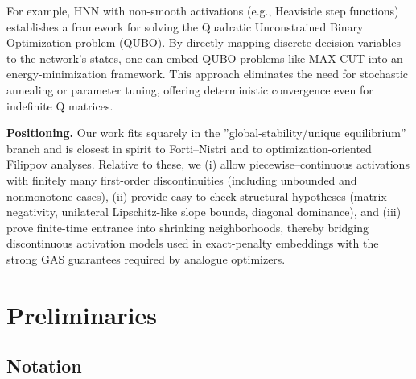 \documentclass[journal]{IEEEtran}
\theoremstyle{myplain}
\begin{document}
For example, HNN with non-smooth activations (e.g., Heaviside step functions) establishes a framework for solving the Quadratic Unconstrained Binary Optimization problem (QUBO). By directly mapping discrete decision variables to the network’s states, one can embed QUBO problems like MAX-CUT into an energy-minimization framework. This approach eliminates the need for stochastic annealing or parameter tuning, offering deterministic convergence
even for indefinite Q matrices.

\textbf{Positioning.}
Our work fits squarely in the ''global-stability/unique equilibrium'' branch 
and is closest in spirit to Forti–Nistri and to optimization-oriented Filippov analyses. 
Relative to these, we 
(i) allow piecewise–continuous activations with finitely many first-order discontinuities 
(including unbounded and nonmonotone cases), 
(ii) provide easy-to-check structural hypotheses (matrix negativity, unilateral Lipschitz-like slope bounds, 
diagonal dominance), and 
(iii) prove finite-time entrance into shrinking neighborhoods, thereby bridging discontinuous activation models 
used in exact-penalty embeddings with the strong GAS guarantees required by analogue optimizers.

\section{Preliminaries}\label{sec:prelim}
\subsection{Notation}
\end{document}
